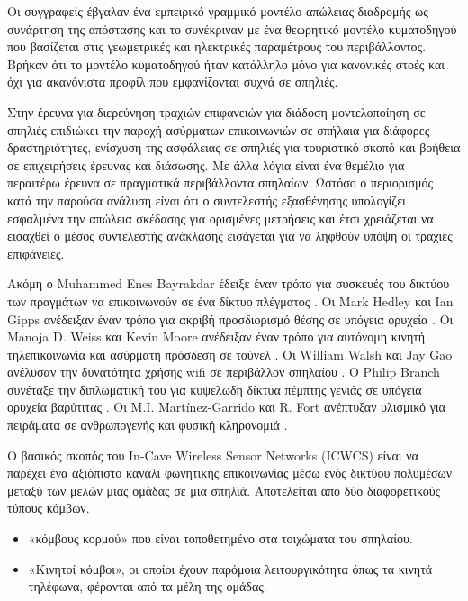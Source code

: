 \documentclass[12pt]{article}
\begin{document}
\begin{multicols*}{2}
        Οι συγγραφείς έβγαλαν ένα εμπειρικό γραμμικό μοντέλο απώλειας διαδρομής ως συνάρτηση
        της απόστασης και το συνέκριναν με ένα θεωρητικό μοντέλο κυματοδηγού που βασίζεται στις
        γεωμετρικές και ηλεκτρικές παραμέτρους του περιβάλλοντος. Βρήκαν ότι το μοντέλο κυματοδηγού
        ήταν κατάλληλο μόνο για κανονικές στοές και όχι για ακανόνιστα προφίλ που εμφανίζονται
        συχνά σε σπηλιές.
        
        Στην έρευνα για διερεύνηση τραχιών επιφανειών για διάδοση μοντελοποίηση σε σπηλιές
        \cite{soo_investigation_2018} επιδιώκει την παροχή ασύρματων επικοινωνιών σε σπήλαια
        για διάφορες δραστηριότητες, ενίσχυση της ασφάλειας σε σπηλιές για τουριστικό σκοπό
        και βοήθεια σε επιχειρήσεις έρευνας και διάσωσης. Με άλλα λόγια είναι ένα θεμέλιο για
        περαιτέρω έρευνα σε πραγματικά περιβάλλοντα σπηλαίων. Ωστόσο ο περιορισμός κατά την
        παρούσα ανάλυση είναι ότι ο συντελεστής εξασθένησης υπολογίζει εσφαλμένα την απώλεια
        σκέδασης για ορισμένες μετρήσεις και έτσι χρειάζεται να εισαχθεί ο μέσος συντελεστής
        ανάκλασης εισάγεται για να ληφθούν υπόψη οι τραχιές επιφάνειες.

        Ακόμη ο Muhammed Enes Bayrakdar έδειξε έναν τρόπο για
        συσκευές του δικτύου των πραγμάτων να επικοινωνούν σε ένα δίκτυο πλέγματος
        \cite{bayrakdar_rule_2019}. Οι Mark Hedley και Ian Gipps ανέδειξαν έναν τρόπο για
        ακριβή προσδιορισμό θέσης σε υπόγεια ορυχεία \cite{hedley_accurate_2013}. Οι
        Manoja D. Weiss και Kevin Moore ανέδειξαν έναν τρόπο για αυτόνομη κινητή
        τηλεπικοινωνία και ασύρματη πρόσδεση σε τούνελ \cite{weiss_autonomous_2009}. Οι
        William Walsh και Jay Gao ανέλυσαν την δυνατότητα χρήσης wifi σε περιβάλλον
        σπηλαίου \cite{walsh_communications_2018}. Ο Philip Branch συνέταξε την
        διπλωματική του για κυψελωδη δίκτυα πέμπτης γενιάς σε υπόγεια ορυχεία βαρύτιτας
        \cite{branch_fifth_2021}. Οι M.I. Martínez-Garrido και R. Fort ανέπτυξαν υλισμικό
        για πειράματα σε ανθρωπογενής και φυσική κληρονομιά
        \cite{martinez-garrido_experimental_2016}.

        Ο βασικός σκοπός του In-Cave Wireless
        Sensor Networks (ICWCS) είναι να παρέχει ένα αξιόπιστο κανάλι φωνητικής επικοινωνίας
        μέσω ενός δικτύου πολυμέσων μεταξύ των μελών μιας ομάδας σε μια σπηλιά. Αποτελείται
        από δύο διαφορετικούς τύπους κόμβων. 
        \begin{itemize}
            \item «κόμβους κορμού» που είναι τοποθετημένο στα τοιχώματα του σπηλαίου.
            \item «Κινητοί κόμβοι», οι οποίοι έχουν παρόμοια λειτουργικότητα όπως τα κινητά
            τηλέφωνα, φέρονται από τα μέλη της ομάδας.
        \end{itemize}


\end{multicols*}
\end{document}
